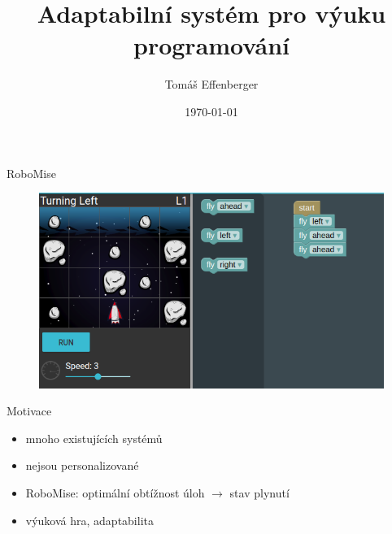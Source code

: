 \documentclass[
]{beamer}
\begin{document}
\title{Adaptabilní systém pro výuku programování}
\author[T.\,Effenberger]{Tomáš Effenberger} %
\date{\today}

\begin{frame}[plain]
\maketitle
\end{frame}



\begin{frame}{RoboMise}
\begin{figure}
\includegraphics[width=\textwidth,height=.65\textheight,keepaspectratio]{../img/robomission-task1}
\end{figure}
\end{frame}

\begin{frame}{Motivace}
\begin{itemize}
\item mnoho existujících systémů
\item nejsou personalizované
\item RoboMise: optimální obtížnost úloh $\rightarrow$ stav plynutí
\item výuková hra, adaptabilita
\end{itemize}
\end{frame}
\end{document}

